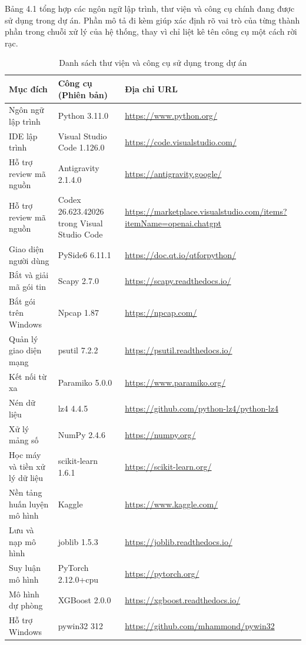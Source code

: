 \documentclass[../DoAn.tex]{subfiles}
\begin{document}
\noindent Bảng 4.1 tổng hợp các ngôn ngữ lập trình, thư viện và công cụ chính đang được sử dụng trong dự án. Phần mô tả đi kèm giúp xác định rõ vai trò của từng thành phần trong chuỗi xử lý của hệ thống, thay vì chỉ liệt kê tên công cụ một cách rời rạc.

\renewcommand{\arraystretch}{1.15}
\setlength{\tabcolsep}{4pt}
\begin{table}[H]
\centering
\begin{tabular}{p{3.45cm}p{5.95cm}p{3.95cm}}
\hline
\textbf{Mục đích} & \textbf{Công cụ (Phiên bản)} & \textbf{Địa chỉ URL} \\ \hline
Ngôn ngữ lập trình & Python 3.11.0 & \url{https://www.python.org/} \\ \hline
IDE lập trình & Visual Studio Code 1.126.0 & \url{https://code.visualstudio.com/} \\ \hline
Hỗ trợ review mã nguồn & Antigravity 2.1.4.0 & \url{https://antigravity.google/} \\ \hline
Hỗ trợ review mã nguồn & Codex 26.623.42026 trong Visual Studio Code & \url{https://marketplace.visualstudio.com/items?itemName=openai.chatgpt} \\ \hline
Giao diện người dùng & PySide6 6.11.1 & \url{https://doc.qt.io/qtforpython/} \\ \hline
Bắt và giải mã gói tin & Scapy 2.7.0 & \url{https://scapy.readthedocs.io/} \\ \hline
Bắt gói trên Windows & Npcap 1.87 & \url{https://npcap.com/} \\ \hline
Quản lý giao diện mạng & psutil 7.2.2 & \url{https://psutil.readthedocs.io/} \\ \hline
Kết nối từ xa & Paramiko 5.0.0 & \url{https://www.paramiko.org/} \\ \hline
Nén dữ liệu & lz4 4.4.5 & \url{https://github.com/python-lz4/python-lz4} \\ \hline
Xử lý mảng số & NumPy 2.4.6 & \url{https://numpy.org/} \\ \hline
Học máy và tiền xử lý dữ liệu & scikit-learn 1.6.1 & \url{https://scikit-learn.org/} \\ \hline
Nền tảng huấn luyện mô hình & Kaggle & \url{https://www.kaggle.com/} \\ \hline
Lưu và nạp mô hình & joblib 1.5.3 & \url{https://joblib.readthedocs.io/} \\ \hline
Suy luận mô hình & PyTorch 2.12.0+cpu & \url{https://pytorch.org/} \\ \hline
Mô hình dự phòng & XGBoost 2.0.0 & \url{https://xgboost.readthedocs.io/} \\ \hline
Hỗ trợ Windows & pywin32 312 & \url{https://github.com/mhammond/pywin32} \\ \hline
\end{tabular}
\caption{Danh sách thư viện và công cụ sử dụng trong dự án}
\label{tab:tools_and_libraries}
\end{table}
\end{document}
